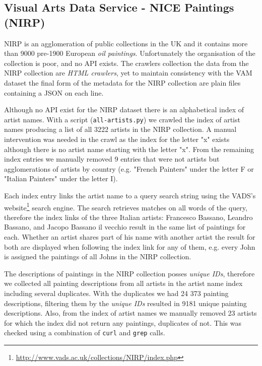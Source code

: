\documentclass[11pt,a4paper,draft]{report}
\begin{document}
\begin{multicols}{2}
\section{Visual Arts Data Service - NICE Paintings (NIRP)}

NIRP is an agglomeration of public collections in the UK and it contains more
than 9000 pre-1900 European \emph{oil paintings}.  Unfortunately the
organisation of the collection is poor, and no API exists.  The crawlers
collection the data from the NIRP collection are \emph{HTML crawlers}, yet to
maintain consistency with the VAM dataset the final form of the metadata for
the NIRP collection are plain files containing a JSON on each line.

Although no API exist for the NIRP dataset there is an alphabetical index of
artist names.  With a script (\texttt{all-artists.py}) we crawled the index of
artist names producing a list of all 3222 artists in the NIRP collection.
A manual intervention was needed in the crawl as the index for the letter "x"
exists although there is no artist name starting with the letter "x".  From the
remaining index entries we manually removed 9 entries that were not artists but
agglomerations of artists by country (e.g. "French Painters" under the letter F
or "Italian Painters" under the letter I).

Each index entry links the artist name to a query search string using the
VADS's website\footnote{\href{http://www.vads.ac.uk/collections/NIRP/index.php}
{http://www.vads.ac.uk/collections/NIRP/index.php}} search engine.  The search
retrieves matches on all words of the query, therefore the index links of the
three Italian artists: Francesco Bassano, Leandro Bassano, and Jacopo Bassano
il vecchio result in the same list of paintings for each.  Whether an artist
shares part of his name with another artist the result for both are displayed
when following the index link for any of them, e.g. every John is assigned the
paintings of all Johns in the NIRP collection.

The descriptions of paintings in the NIRP collection posses \emph{unique IDs},
therefore we collected all painting descriptions from all artists in the artist
name index including several duplicates.  With the duplicates we had 24 373
painting descriptions, filtering them by the \emph{unique IDs} resulted in 9181
unique painting descriptions.  Also, from the index of artist names we manually
removed 23 artists for which the index did not return any paintings, duplicates
of not.  This was checked using a combination of \texttt{curl} and
\texttt{grep} calls.


\end{multicols}
\end{document}
